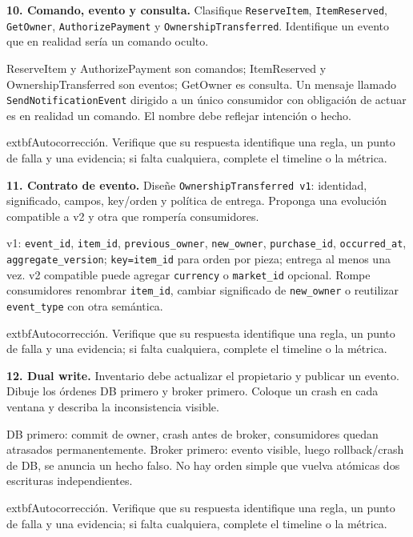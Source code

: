 \documentclass[variant=guiaresuelta,cover=institutional,mode=screen]{ua-engineering-v6-article}
\begin{document}
\begin{uaexercise}
\textbf{10. Comando, evento y consulta.} Clasifique \texttt{ReserveItem}, \texttt{ItemReserved}, \texttt{GetOwner}, \texttt{AuthorizePayment} y \texttt{OwnershipTransferred}. Identifique un evento que en realidad sería un comando oculto.
\end{uaexercise}
\begin{uaanswer}
ReserveItem y AuthorizePayment son comandos; ItemReserved y OwnershipTransferred son eventos; GetOwner es consulta. Un mensaje llamado \texttt{SendNotificationEvent} dirigido a un único consumidor con obligación de actuar es en realidad un comando. El nombre debe reflejar intención o hecho.
\par\smallskip	extbf{Autocorrección.} Verifique que su respuesta identifique una regla, un punto de falla y una evidencia; si falta cualquiera, complete el timeline o la métrica.
\end{uaanswer}
\begin{uaexercise}
\textbf{11. Contrato de evento.} Diseñe \texttt{OwnershipTransferred v1}: identidad, significado, campos, key/orden y política de entrega. Proponga una evolución compatible a v2 y otra que rompería consumidores.
\end{uaexercise}
\begin{uaanswer}
v1: \texttt{event\_id}, \texttt{item\_id}, \texttt{previous\_owner}, \texttt{new\_owner}, \texttt{purchase\_id}, \texttt{occurred\_at}, \texttt{aggregate\_version}; \texttt{key=item\_id} para orden por pieza; entrega al menos una vez. v2 compatible puede agregar \texttt{currency} o \texttt{market\_id} opcional. Rompe consumidores renombrar \texttt{item\_id}, cambiar significado de \texttt{new\_owner} o reutilizar \texttt{event\_type} con otra semántica.
\par\smallskip	extbf{Autocorrección.} Verifique que su respuesta identifique una regla, un punto de falla y una evidencia; si falta cualquiera, complete el timeline o la métrica.
\end{uaanswer}
\begin{uaexercise}
\textbf{12. Dual write.} Inventario debe actualizar el propietario y publicar un evento. Dibuje los órdenes DB primero y broker primero. Coloque un crash en cada ventana y describa la inconsistencia visible.
\end{uaexercise}
\begin{uaanswer}
DB primero: commit de owner, crash antes de broker, consumidores quedan atrasados permanentemente. Broker primero: evento visible, luego rollback/crash de DB, se anuncia un hecho falso. No hay orden simple que vuelva atómicas dos escrituras independientes.
\par\smallskip	extbf{Autocorrección.} Verifique que su respuesta identifique una regla, un punto de falla y una evidencia; si falta cualquiera, complete el timeline o la métrica.
\end{uaanswer}
\end{document}
